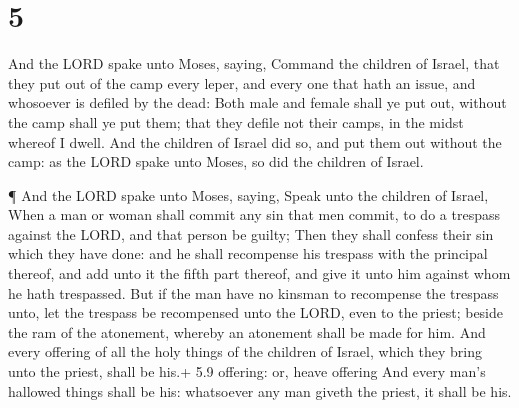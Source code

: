 \hypertarget{section-4}{%
\section{5}\label{section-4}}

 And the LORD spake unto Moses, saying,  Command
the children of Israel, that they put out of the camp every leper, and
every one that hath an issue, and whosoever is defiled by the dead:
 Both male and female shall ye put out, without the camp
shall ye put them; that they defile not their camps, in the midst
whereof I dwell.  And the children of Israel did so, and put
them out without the camp: as the LORD spake unto Moses, so did the
children of Israel.

 ¶ And the LORD spake unto Moses, saying,  Speak
unto the children of Israel, When a man or woman shall commit any sin
that men commit, to do a trespass against the LORD, and that person be
guilty;  Then they shall confess their sin which they have
done: and he shall recompense his trespass with the principal thereof,
and add unto it the fifth part thereof, and give it unto him against
whom he hath trespassed.  But if the man have no kinsman to
recompense the trespass unto, let the trespass be recompensed unto the
LORD, even to the priest; beside the ram of the atonement, whereby an
atonement shall be made for him.  And every offering of all
the holy things of the children of Israel, which they bring unto the
priest, shall be his.+ 5.9 offering: or, heave offering 
And every man's hallowed things shall be his: whatsoever any man giveth
the priest, it shall be his.


